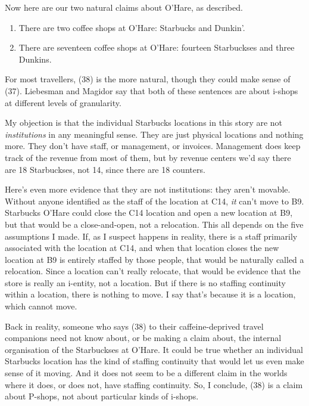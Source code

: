 \documentclass[
  11pt,
  letterpaper,
  DIV=11,
  numbers=noendperiod,
  twoside]{scrartcl}
\providecommand{\tightlist}{%
  \setlength{\itemsep}{0pt}\setlength{\parskip}{0pt}}
\begin{document}
Now here are our two natural claims about O'Hare, as described.

\begin{enumerate}
\def\labelenumi{(\arabic{enumi})}
\setcounter{enumi}{36}
\tightlist
\item
  There are two coffee shops at O'Hare: Starbucks and Dunkin'.
\item
  There are seventeen coffee shops at O'Hare: fourteen Starbuckses and
  three Dunkins.
\end{enumerate}

For most travellers, (38) is the more natural, though they could make
sense of (37). Liebesman and Magidor say that both of these sentences
are about i-shops at different levels of granularity.

My objection is that the individual Starbucks locations in this story
are not \emph{institutions} in any meaningful sense. They are just
physical locations and nothing more. They don't have staff, or
management, or invoices. Management does keep track of the revenue from
most of them, but by revenue centers we'd say there are 18 Starbuckses,
not 14, since there are 18 counters.

Here's even more evidence that they are not institutions: they aren't
movable. Without anyone identified as the staff of the location at C14,
\emph{it} can't move to B9. Starbucks O'Hare could close the C14
location and open a new location at B9, but that would be a
close-and-open, not a relocation. This all depends on the five
assumptions I made. If, as I suspect happens in reality, there is a
staff primarily associated with the location at C14, and when that
location closes the new location at B9 is entirely staffed by those
people, that would be naturally called a relocation. Since a location
can't really relocate, that would be evidence that the store is really
an i-entity, not a location. But if there is no staffing continuity
within a location, there is nothing to move. I say that's because it is
a location, which cannot move.

Back in reality, someone who says (38) to their caffeine-deprived travel
companions need not know about, or be making a claim about, the internal
organisation of the Starbuckses at O'Hare. It could be true whether an
individual Starbucks location has the kind of staffing continuity that
would let us even make sense of it moving. And it does not seem to be a
different claim in the worlds where it does, or does not, have staffing
continuity. So, I conclude, (38) is a claim about P-shops, not about
particular kinds of i-shops.
\end{document}
